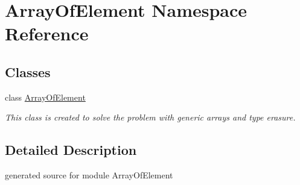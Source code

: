 \hypertarget{namespace_array_of_element}{}\section{Array\+Of\+Element Namespace Reference}
\label{namespace_array_of_element}
\subsection*{Classes}
\begin{DoxyCompactItemize}
\item 
class \hyperlink{class_array_of_element_1_1_array_of_element}{Array\+Of\+Element}
\begin{DoxyCompactList}\small\item\em This class is created to solve the problem with generic arrays and type erasure. \end{DoxyCompactList}\end{DoxyCompactItemize}


\subsection{Detailed Description}
\begin{DoxyVerb}generated source for module ArrayOfElement \end{DoxyVerb}
 
